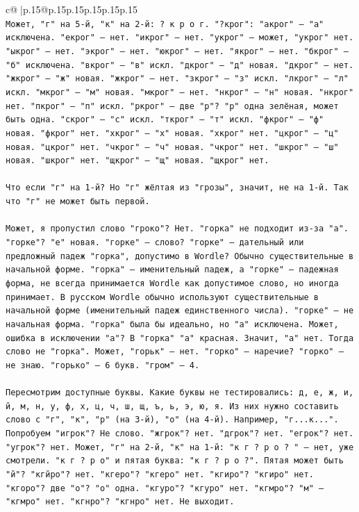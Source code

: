 \documentclass{article}
\begin{document}
{\begin{supertabular}{c@{$\;$}|p{.15\linewidth}@{}p{.15\linewidth}p{.15\linewidth}p{.15\linewidth}p{.15\linewidth}p{.15\linewidth}}
{{{\\ 
\texttt{Может, "г" на 5{-}й, "к" на 2{-}й: ? к р о г. "?крог": "акрог" — "а" исключена. "екрог" — нет. "икрог" — нет. "укрог" — может, "укрог" нет. "ыкрог" — нет. "экрог" — нет. "юкрог" — нет. "якрог" — нет. "бкрог" — "б" исключена. "вкрог" — "в" искл. "дкрог" — "д" новая. "дкрог" — нет. "жкрог" — "ж" новая. "жкрог" — нет. "зкрог" — "з" искл. "лкрог" — "л" искл. "мкрог" — "м" новая. "мкрог" — нет. "нкрог" — "н" новая. "нкрог" нет. "пкрог" — "п" искл. "ркрог" — две "р"? "р" одна зелёная, может быть одна. "скрог" — "с" искл. "ткрог" — "т" искл. "фкрог" — "ф" новая. "фкрог" нет. "хкрог" — "х" новая. "хкрог" нет. "цкрог" — "ц" новая. "цкрог" нет. "чкрог" — "ч" новая. "чкрог" нет. "шкрог" — "ш" новая. "шкрог" нет. "щкрог" — "щ" новая. "щкрог" нет.} \\
\\ 
\texttt{Что если "г" на 1{-}й? Но "г" жёлтая из "грозы", значит, не на 1{-}й. Так что "г" не может быть первой.} \\
\\ 
\texttt{Может, я пропустил слово "гроко"? Нет. "горка" не подходит из{-}за "а". "горке"? "е" новая. "горке" — слово? "горке" — дательный или предложный падеж "горка", допустимо в Wordle? Обычно существительные в начальной форме. "горка" — именительный падеж, а "горке" — падежная форма, не всегда принимается Wordle как допустимое слово, но иногда принимает. В русском Wordle обычно используют существительные в начальной форме (именительный падеж единственного числа). "горке" — не начальная форма. "горка" была бы идеально, но "а" исключена. Может, ошибка в исключении "а"? В "горка" "а" красная. Значит, "а" нет. Тогда слово не "горка". Может, "горьк" — нет. "горко" — наречие? "горко" — не знаю. "горько" — 6 букв. "гром" — 4.} \\
\\ 
\texttt{Пересмотрим доступные буквы. Какие буквы не тестировались: д, е, ж, и, й, м, н, у, ф, х, ц, ч, ш, щ, ъ, ь, э, ю, я. Из них нужно составить слово с "г", "к", "р" (на 3{-}й), "о" (на 4{-}й). Например, "г...к...". Попробуем "игрок"? Не слово. "жгрок"? нет. "дгрок"? нет. "егрок"? нет. "угрок"? нет. Может, "г" на 2{-}й, "к" на 1{-}й: "к г ? р о ? " — нет, уже смотрели. "к г ? р о" и пятая буква: "к г ? р о ?". Пятая может быть "й"? "кгйро"? нет. "кгеро"? "кгеро" нет. "кгиро"? "кгиро" нет. "кгоро"? две "о"? "о" одна. "кгуро"? "кгуро" нет. "кгмро"? "м" — "кгмро" нет. "кгнро"? "кгнро" нет. Не выходит.} \\
\\ 
}}}
\end{supertabular}}
\end{document}
